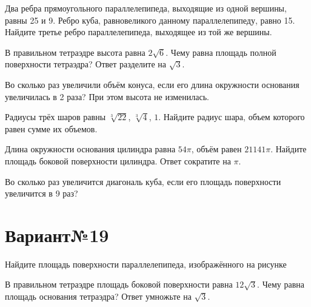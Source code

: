 \documentclass[4apaper]{article}
\begin{document}
\begin{taskBN}{1}
Два ребра прямоугольного параллелепипеда, выходящие из одной вершины, равны 25 и 9. Ребро куба, равновеликого данному параллелепипеду, равно 15. Найдите третье ребро параллелепипеда, выходящее из той же вершины.
\end{taskBN}

\begin{taskBN}{2}
В правильном тетраэдре высота равна $2\sqrt{6}$. Чему равна площадь полной поверхности тетраэдра? Ответ разделите на $\sqrt{3}$.
\end{taskBN}

\begin{taskBN}{3}
Во сколько раз увеличили объём конуса, если его длина окружности основания увеличилась в 2 раза? При этом высота не изменилась.
\end{taskBN}

\begin{taskBN}{4}
Радиусы трёх шаров равны $\sqrt[3]{22}$, $\sqrt[3]{4}$, $1$. Найдите радиус шара, объем которого равен сумме их объемов.
\end{taskBN}

\begin{taskBN}{5}
Длина окружности основания цилиндра равна $54\pi$, объём равен $21141\pi$. Найдите площадь боковой поверхности цилиндра. Ответ сократите на $\pi$.
\end{taskBN}

\begin{taskBN}{6}
Во сколько раз увеличится диагональ куба, если его площадь поверхности увеличится в 9 раз?
\end{taskBN}
\newpage\section*{Вариант№19}

\begin{taskBN}{1}
Найдите площадь поверхности параллелепипеда, изображённого на рисунке
\end{taskBN}

\begin{taskBN}{2}
В правильном тетраэдре площадь боковой поверхности равна $12\sqrt{3}$. Чему равна площадь основания тетраэдра? Ответ умножьте на $\sqrt{3}$.
\end{taskBN}
\end{document}
